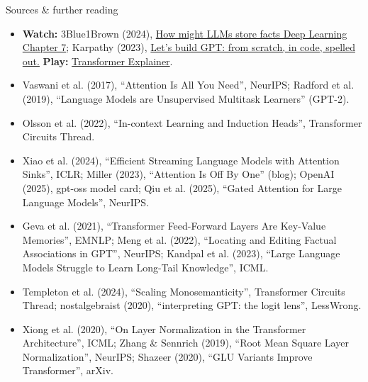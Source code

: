 \documentclass[aspectratio=169]{beamer}
\newcommand{\link}[2]{\href{#1}{\textcolor{popblue}{#2}}}   %
\begin{document}
\begin{frame}{Sources \& further reading}
  \footnotesize
  \begin{itemize}
    \item \textbf{Watch:} 3Blue1Brown (2024),
      \link{https://www.youtube.com/watch?v=9-Jl0dxWQs8}{How might LLMs store facts \textbar{} Deep
      Learning Chapter 7}; Karpathy (2023), \link{https://youtu.be/kCc8FmEb1nY?t=4919}{Let's build
      GPT: from scratch, in code, spelled out.} \textbf{Play:}
      \link{https://poloclub.github.io/transformer-explainer/}{Transformer Explainer}.
    \item Vaswani et al. (2017), ``Attention Is All You Need'', NeurIPS; Radford et al. (2019),
      ``Language Models are Unsupervised Multitask Learners'' (GPT-2).
    \item Olsson et al. (2022), ``In-context Learning and Induction Heads'', Transformer Circuits
      Thread.
    \item Xiao et al. (2024), ``Efficient Streaming Language Models with Attention Sinks'', ICLR;
      Miller (2023), ``Attention Is Off By One'' (blog); OpenAI (2025), gpt-oss model card; Qiu et
      al. (2025), ``Gated Attention for Large Language Models'', NeurIPS.
    \item Geva et al. (2021), ``Transformer Feed-Forward Layers Are Key-Value Memories'', EMNLP;
      Meng et al. (2022), ``Locating and Editing Factual Associations in GPT'', NeurIPS; Kandpal et
      al. (2023), ``Large Language Models Struggle to Learn Long-Tail Knowledge'', ICML.
    \item Templeton et al. (2024), ``Scaling Monosemanticity'', Transformer Circuits Thread;
      nostalgebraist (2020), ``interpreting GPT: the logit lens'', LessWrong.
    \item Xiong et al. (2020), ``On Layer Normalization in the Transformer Architecture'', ICML;
      Zhang \& Sennrich (2019), ``Root Mean Square Layer Normalization'', NeurIPS; Shazeer (2020),
      ``GLU Variants Improve Transformer'', arXiv.
  \end{itemize}
\end{frame}
\end{document}
